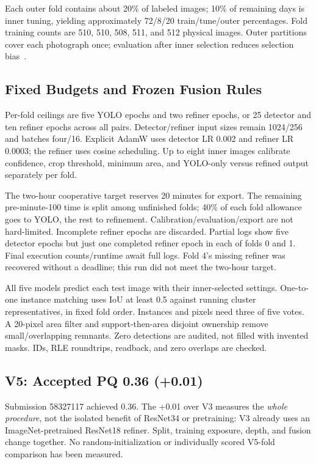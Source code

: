 \documentclass[sigconf]{acmart}
\begin{document}
Each outer fold contains about 20\% of labeled images; 10\% of remaining
days is inner tuning, yielding approximately 72/8/20 train/tune/outer
percentages. Fold training counts are 510, 510, 508, 511, and 512 physical
images. Outer partitions cover each photograph once; evaluation after inner
selection reduces selection bias~\cite{varma2006}.

\subsection{Fixed Budgets and Frozen Fusion Rules}
Per-fold ceilings are five YOLO epochs and two refiner epochs, or 25
detector and ten refiner epochs across all pairs. Detector/refiner input
sizes remain 1024/256 and batches four/16. Explicit AdamW uses
detector LR 0.002 and refiner LR 0.0003; the refiner uses cosine scheduling.
Up to eight inner images calibrate confidence, crop threshold, minimum
area, and YOLO-only versus refined output separately per fold.

The two-hour cooperative target reserves 20 minutes for export.
The remaining pre-minute-100 time is split among unfinished folds;
40\% of each fold allowance goes to YOLO, the rest to refinement.
Calibration/evaluation/export are not hard-limited. Incomplete refiner
epochs are discarded. Partial logs show five detector epochs but just
one completed refiner epoch in each of folds 0 and 1. Final execution
counts/runtime await full logs. Fold 4's missing refiner was recovered
without a deadline; this run did not meet the two-hour target.

All five models predict each test image with their inner-selected settings.
One-to-one instance matching uses IoU at least 0.5 against running cluster
representatives, in fixed fold order. Instances and pixels need three of
five votes. A 20-pixel area filter and support-then-area disjoint ownership
remove small/overlapping remnants. Zero detections are audited, not filled
with invented masks. IDs, RLE roundtrips, readback, and zero overlaps are checked.

\subsection{V5: Accepted PQ 0.36 (+0.01)}
Submission 58327117 achieved 0.36. The +0.01 over V3 measures the \emph{whole procedure},
not the isolated benefit of ResNet34 or pretraining: V3 already uses an
ImageNet-pretrained ResNet18 refiner. Split, training exposure, depth, and
fusion change together. No random-initialization or individually scored
V5-fold comparison has been measured.
\end{document}
